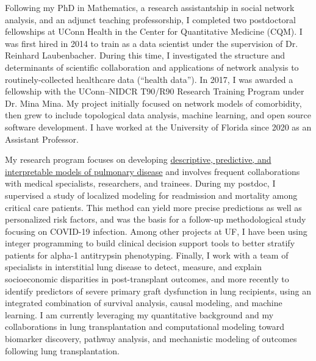\documentclass{nihbiosketch}
\begin{document}
\begin{statement}

Following my PhD in Mathematics, a research assistantship in social network analysis, and an adjunct teaching professorship, I completed two postdoctoral fellowships at UConn Health in the Center for Quantitative Medicine (CQM).
I was first hired in 2014 to train as a data scientist under the supervision of Dr. Reinhard Laubenbacher.
During this time, I investigated the structure and determinants of scientific collaboration and applications of network analysis to routinely-collected healthcare data (``health data'').
In 2017, I was awarded a fellowship with the UConn--NIDCR T90/R90 Research Training Program under Dr. Mina Mina.
My project initially focused on network models of comorbidity, then grew to include topological data analysis, machine learning, and open source software development.
I have worked at the University of Florida since 2020 as an Assistant Professor.

My research program focuses on developing \uline{descriptive, predictive, and interpretable models of pulmonary disease} and involves frequent collaborations with medical specialists, researchers, and trainees.
During my postdoc, I supervised a study of localized modeling for readmission and mortality among critical care patients. This method can yield more precise predictions as well as personalized risk factors, and was the basis for a follow-up methodological study focusing on COVID-19 infection.
Among other projects at UF, I have been using integer programming to build clinical decision support tools to better stratify patients for alpha-1 antitrypsin phenotyping.
Finally, I work with a team of specialists in interstitial lung disease to detect, measure, and explain socioeconomic disparities in post-transplant outcomes, and more recently to identify predictors of severe primary graft dysfunction in lung recipients, using an integrated combination of survival analysis, causal modeling, and machine learning.
I am currently leveraging my quantitative background and my collaborations in lung transplantation and computational modeling toward biomarker discovery, pathway analysis, and mechanistic modeling of outcomes following lung transplantation.


\end{statement}
\end{document}
